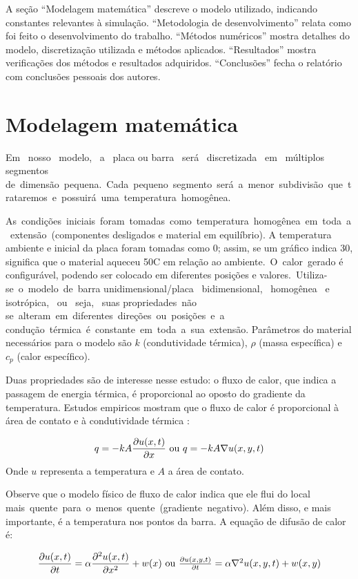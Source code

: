 \documentclass[12pt,fleqn]{article}
\begin{document}
A seção ``Modelagem matemática'' descreve o modelo utilizado, indicando constantes relevantes à simulação. ``Metodologia de desenvolvimento'' relata como foi feito o desenvolvimento do trabalho. ``Métodos numéricos'' mostra detalhes do modelo, discretização utilizada e métodos aplicados. ``Resultados'' mostra verificações dos métodos e resultados adquiridos. ``Conclusões'' fecha o relatório com conclusões pessoais dos autores.

\section{Modelagem matemática}
Em  nosso  modelo,  a  placa ou barra  será  discretizada  em  múltiplos  segmentos  de dimensão pequena. Cada pequeno segmento será a menor subdivisão que trataremos e possuirá uma temperatura homogênea.

As condições iniciais foram tomadas como temperatura homogênea em toda a extensão (componentes desligados e material em equilíbrio). A temperatura ambiente e inicial da placa foram tomadas como 0; assim, se um gráfico indica 30, significa que o material aqueceu 50\textdegree C em relação ao ambiente. O calor gerado é configurável, podendo ser colocado em diferentes posições e valores. Utiliza­-se o modelo de barra unidimensional/placa  bidimensional,  homogênea  e  isotrópica,  ou  seja,  suas propriedades não  se alteram em diferentes direções ou posições e a  condução térmica é constante em toda a sua extensão. Parâmetros do material necessários para o modelo são $k$ (condutividade térmica), $\rho$ (massa específica) e $c_p$ (calor específico).

Duas propriedades são de interesse nesse estudo: o fluxo de calor, que indica a passagem de energia térmica, é proporcional ao oposto do gradiente da temperatura. Estudos empiricos mostram que o fluxo de calor é proporcional à área de contato e à condutividade térmica \cite{ufsc_geracao_de_calor}:

\[q = -k A \frac{\partial u(x, t)}{\partial x} $ ou $ q = -k A \nabla u(x, y, t)\]
Onde $u$ representa a temperatura e $A$ a área de contato.

Observe que o modelo físico de fluxo de calor indica que ele flui do local mais quente para o menos quente (gradiente negativo). Além disso, e mais importante, é a temperatura nos pontos da barra. A equação de difusão de calor é:

\[\frac{\partial u(x, t)}{\partial t} = \alpha \frac{\partial^2 u(x, t)}{\partial x^2} + w(x) $ ou $ \frac{\partial u(x, y, t)}{\partial t} = \alpha \nabla^2 u(x, y, t) + w(x, y)\]
\end{document}
